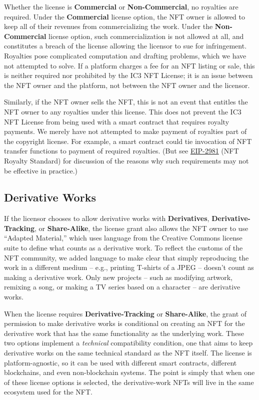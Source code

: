 \documentclass{article}
\newcommand{\iccclicense}{IC3 NFT License\xspace}
\newcommand{\keyword}[1]{\textbf{#1}\xspace}
\newcommand{\commercial}{\keyword{Commercial}}
\newcommand{\noncommercial}{\keyword{Non-Commercial}}
\newcommand{\derivative}{\keyword{Derivatives}}
\newcommand{\sharealike}{\keyword{Share-Alike}}
\newcommand{\derivativetracking}{\keyword{Derivative-Tracking}}
\begin{document}
Whether the license is \commercial or \noncommercial, no royalties are required. Under the \commercial license option, the NFT owner is allowed to keep all of their revenues from commercializing the work. Under the \noncommercial license option, such commercialization is not allowed at all, and constitutes a breach of the license allowing the licensor to sue for infringement. Royalties pose complicated computation and drafting problems, which we have not attempted to solve. If a platform charges a fee for an NFT listing or sale, this is neither required nor prohibited by the \iccclicense; it is an issue between the NFT owner and the platform, not between the NFT owner and the licensor.  

Similarly, if the NFT owner sells the NFT, this is not an event that entitles the NFT owner to any royalties under this license.  This does not prevent the \iccclicense from being used with a smart contract that requires royalty payments. We merely have not attempted to make payment of royalties part of the copyright license. For example, a smart contract could tie invocation of NFT transfer functions to payment of required royalties. (But see \href{https://eips.ethereum.org/EIPS/eip-2981}{EIP-2981} (NFT Royalty Standard) for discussion of the reasons why such requirements may not  be effective in practice.) 

\subsection{Derivative Works}

If the licensor chooses to allow derivative works with \derivative, \derivativetracking, or \sharealike, the license grant also allows the NFT owner to use ``Adapted Material,'' which uses language from the Creative Commons license suite to define what counts as a derivative work. To reflect the customs of the NFT community, we added language to make clear that simply reproducing the work in a different medium -- e.g., printing T-shirts of a JPEG -- doesn't count as making a derivative work. Only new projects -- such as modifying artwork, remixing a song, or making a TV series based on a character -- are derivative works.

When the license requires \derivativetracking or \sharealike, the grant of permission to make derivative works is conditional on creating an NFT for the derivative work that has the same functionality as the underlying work. These two options implement a \emph{technical} compatibility condition, one that aims to keep derivative works on the same technical standard as the NFT itself. The license is platform-agnostic, so it can be used with different smart contracts, different blockchains, and even non-blockchain systems. The point is simply that when one of these license options is selected, the derivative-work NFTs will live in the same ecosystem used for the NFT.
\end{document}

